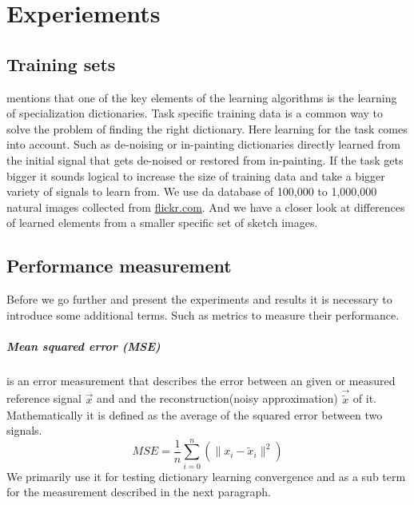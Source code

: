 \chapter{Experiements}

\section{Training sets}
 mentions that one of the key
elements of the learning algorithms is the learning of specialization
dictionaries. Task specific training data is a common way to solve the problem
of finding  the right dictionary. Here learning for the task comes into
account. Such as de-noising or in-painting dictionaries directly learned from
the initial signal that gets de-noised or restored from in-painting. If the task
gets bigger it sounds logical to increase the size of training data and take a
bigger variety of signals to learn from.  We use da database of 100,000
to 1,000,000 natural images collected from \url{flickr.com}. And we have a
closer look at differences of learned elements from a smaller specific set of
sketch images.

\section{Performance measurement}
Before we go further and present the experiments and results it is necessary to
introduce some additional terms. Such as metrics to measure their performance.

\paragraph{Mean squared error (MSE)} is an error measurement that
describes the error between an given or measured reference signal $\vec{x}$
and and the reconstruction(noisy approximation) $\vec{\tilde{x}}$ of it.
Mathematically it is defined as the average of the squared error between two
signals.
\begin{equation*}
 MSE = \frac{1}{n} \sum_{i=0}^{n} \left( {\lVert x_i -
\tilde{x}_i\rVert^{2}}\right)
\end{equation*}
We primarily use it for testing dictionary learning convergence and as a
sub term for the measurement described in the next paragraph.


